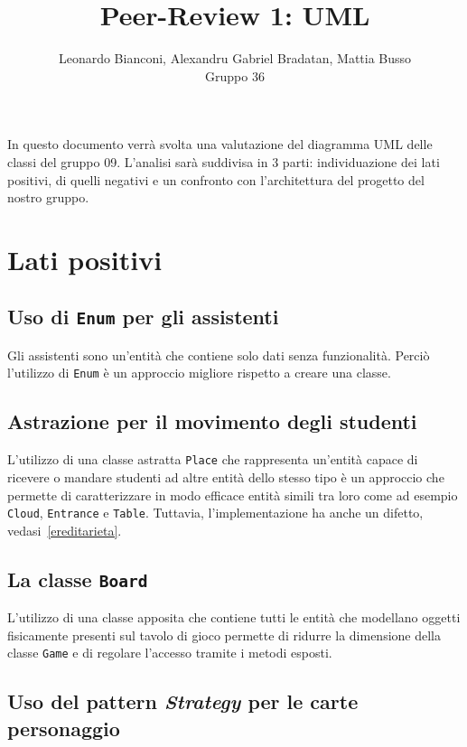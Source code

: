 \documentclass[12pt]{article}
\title{Peer-Review 1: UML}
\author{Leonardo Bianconi, Alexandru Gabriel Bradatan, Mattia Busso\\Gruppo 36}
\begin{document}
    \maketitle

    In questo documento verrà svolta una valutazione del diagramma UML delle classi
    del gruppo 09. L'analisi sarà suddivisa in 3 parti: individuazione dei lati
    positivi, di quelli negativi e un confronto con l'architettura del progetto
    del nostro gruppo.


    \section{Lati positivi}

    \subsection{Uso di \texttt{Enum} per gli assistenti}

    Gli assistenti sono un'entità che contiene solo dati senza funzionalità.
    Perciò l'utilizzo di \texttt{Enum} è un approccio migliore rispetto a creare
    una classe.

    \subsection{Astrazione per il movimento degli studenti}

    L'utilizzo di una classe astratta \texttt{Place} che rappresenta un'entità
    capace di ricevere o mandare studenti ad altre entità dello stesso tipo è un
    approccio che permette di caratterizzare in modo efficace entità simili tra
    loro come ad esempio \texttt{Cloud}, \texttt{Entrance} e \texttt{Table}.
    Tuttavia, l'implementazione ha anche un difetto, vedasi~\ref{ereditarieta}.

    \subsection{La classe \texttt{Board}}

    L'utilizzo di una classe apposita che contiene tutti le entità che
    modellano oggetti fisicamente presenti sul tavolo di gioco permette di
    ridurre la dimensione della classe \texttt{Game} e di regolare l'accesso
    tramite i metodi esposti.

    \subsection{Uso del pattern \textit{Strategy} per le carte personaggio}
\end{document}
